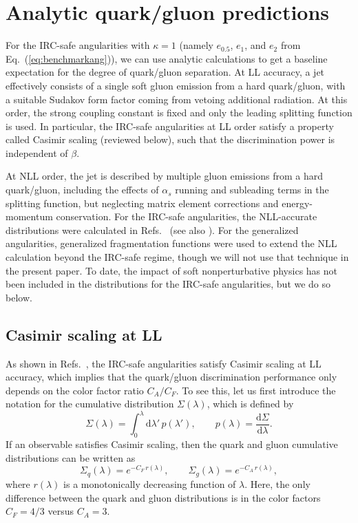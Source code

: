 \documentclass[11pt,letterpaper]{article}
\newcommand{\df}{\text{d}}
\DeclareRobustCommand{\Eq}[1]{Eq.~(\ref{#1})}
\DeclareRobustCommand{\Refs}[1]{Refs.~\cite{#1}}
\newcommand{\be}{\begin{equation}}
\newcommand{\ee}{\end{equation}}
\begin{document}
\section{Analytic quark/gluon predictions}
\label{sec:analytic}

For the IRC-safe angularities with $\kappa = 1$ (namely $e_{0.5}$, $e_1$, and $e_2$ from \Eq{eq:benchmarkang}), we can use analytic calculations to get a baseline expectation for the degree of quark/gluon separation.  At LL accuracy, a jet effectively consists of a single soft gluon emission from a hard quark/gluon, with a suitable Sudakov form factor coming from vetoing additional radiation.  At this order, the strong coupling constant is fixed and only the leading splitting function is used.  In particular, the IRC-safe angularities at LL order satisfy a property called Casimir scaling (reviewed below), such that the discrimination power is independent of $\beta$.

At NLL order, the jet is described by multiple gluon emissions from a hard quark/gluon, including the effects of $\alpha_s$ running and subleading terms in the splitting function, but neglecting matrix element corrections and energy-momentum conservation.  For the IRC-safe angularities, the NLL-accurate distributions were calculated in \Refs{Larkoski:2013eya,Larkoski:2014pca} (see also \cite{Berger:2003iw,Banfi:2004yd,Hornig:2009vb,Ellis:2010rwa,Larkoski:2014uqa}).  For the generalized angularities, generalized fragmentation functions \cite{Krohn:2012fg,Waalewijn:2012sv,Chang:2013rca,Chang:2013iba,Larkoski:2014pca} were used to extend the NLL calculation beyond the IRC-safe regime, though we will not use that technique in the present paper.  To date, the impact of soft nonperturbative physics has not been included in the distributions for the IRC-safe angularities, but we do so below.  

\subsection{Casimir scaling at LL}

As shown in \Refs{Larkoski:2013eya,Larkoski:2014pca}, the IRC-safe angularities satisfy Casimir scaling at LL accuracy, which implies that the quark/gluon discrimination performance only depends on the color factor ratio $C_A/C_F$.  To see this, let us first introduce the notation for the cumulative distribution $\Sigma(\lambda)$, which is defined by
\be
\Sigma(\lambda) = \int_0^\lambda \df \lambda' \, p(\lambda'), \qquad p(\lambda) = \frac{\df \Sigma}{\df \lambda}.
\ee
If an observable satisfies Casimir scaling, then the quark and gluon cumulative distributions can be written as
\be
\label{eq:casimirform}
\Sigma_q(\lambda) = e^{-C_F \, r(\lambda)}, \qquad \Sigma_g(\lambda) = e^{-C_A \, r(\lambda)},
\ee
where $r(\lambda)$ is a monotonically decreasing function of $\lambda$.  Here, the only difference between the quark and gluon distributions is in the color factors $C_F = 4/3$ versus $C_A = 3$.
\end{document}
